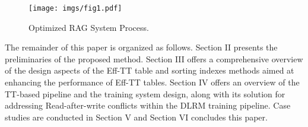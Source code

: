 \begin{figure} [h] \small
    \centering
    \texttt{[image: imgs/fig1.pdf]}
    \caption{Optimized RAG System Process.}
    \label{fig:fig1}
\end{figure}


The remainder of this paper is organized as follows. Section II presents the preliminaries of the proposed method. Section III offers a comprehensive overview of the design aspects of the Eff-TT table and sorting indexes methods aimed at enhancing the performance of Eff-TT tables. Section IV offers an overview of the TT-based pipeline and the training system design, along with its solution for addressing Read-after-write conflicts within the DLRM training pipeline. Case studies are conducted in Section V and Section VI concludes this paper.




        






